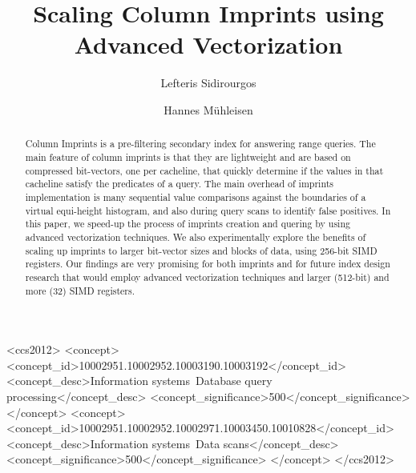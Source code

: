 \documentclass[sigconf]{acmart}
\begin{document}
\title{Scaling Column Imprints using Advanced Vectorization}

\author{Lefteris Sidirourgos}

\author{Hannes M\"uhleisen}

\lstset{basicstyle=\ttfamily}


\begin{abstract}
Column Imprints is a pre-filtering secondary index for answering range queries. The main feature of column imprints is that they are lightweight and are based on compressed bit-vectors, one per cacheline, that quickly determine if the values in that cacheline satisfy the predicates of a query. The main overhead of imprints implementation is many sequential value comparisons against the boundaries of a virtual equi-height histogram, and also during query scans to identify false positives. In this paper, we speed-up the process of imprints creation and quering by using advanced vectorization techniques. We also experimentally explore the benefits of scaling up imprints to larger bit-vector sizes and blocks of data, using 256-bit SIMD registers. Our findings are very promising for both imprints and for future index design research that would employ advanced vectorization techniques and larger (512-bit) and more (32) SIMD registers.

\end{abstract}

\begin{CCSXML}
<ccs2012>
<concept>
<concept_id>10002951.10002952.10003190.10003192</concept_id>
<concept_desc>Information systems~Database query processing</concept_desc>
<concept_significance>500</concept_significance>
</concept>
<concept>
<concept_id>10002951.10002952.10002971.10003450.10010828</concept_id>
<concept_desc>Information systems~Data scans</concept_desc>
<concept_significance>500</concept_significance>
</concept>
</ccs2012>
\end{CCSXML}





\maketitle
\end{document}
